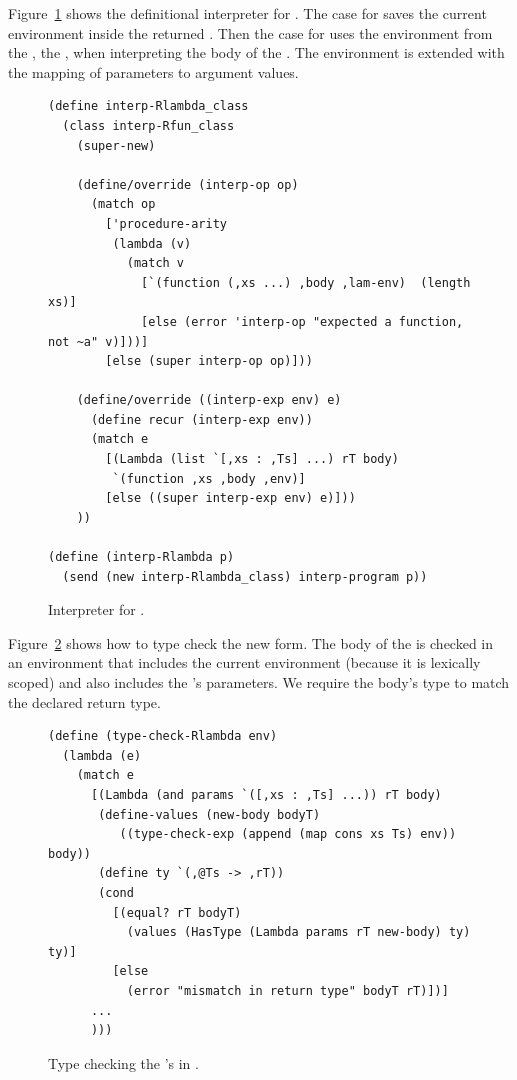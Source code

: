 \documentclass[7x10]{TimesAPriori_MIT}%
\begin{document}
\label{sec:interp-Rlambda}

Figure~\ref{fig:interp-Rlambda} shows the definitional interpreter for
\LangLam{}. The case for  saves the current environment
inside the returned . Then the case for  uses
the environment from the , the , when
interpreting the body of the .  The 
environment is extended with the mapping of parameters to argument
values.

\begin{figure}[tbp]
\begin{lstlisting}
(define interp-Rlambda_class
  (class interp-Rfun_class
    (super-new)

    (define/override (interp-op op)
      (match op
        ['procedure-arity
         (lambda (v)
           (match v
             [`(function (,xs ...) ,body ,lam-env)  (length xs)]
             [else (error 'interp-op "expected a function, not ~a" v)]))]
        [else (super interp-op op)]))

    (define/override ((interp-exp env) e)
      (define recur (interp-exp env))
      (match e
        [(Lambda (list `[,xs : ,Ts] ...) rT body)
         `(function ,xs ,body ,env)]
        [else ((super interp-exp env) e)]))
    ))

(define (interp-Rlambda p)
  (send (new interp-Rlambda_class) interp-program p))
\end{lstlisting}
\caption{Interpreter for \LangLam{}.}
\label{fig:interp-Rlambda}
\end{figure}


\label{sec:type-check-r5}

Figure~\ref{fig:type-check-Rlambda} shows how to type check the new
 form. The body of the  is checked in an
environment that includes the current environment (because it is
lexically scoped) and also includes the 's parameters.  We
require the body's type to match the declared return type.

\begin{figure}[tbp]
\begin{lstlisting}
(define (type-check-Rlambda env)
  (lambda (e)
    (match e
      [(Lambda (and params `([,xs : ,Ts] ...)) rT body)
       (define-values (new-body bodyT) 
          ((type-check-exp (append (map cons xs Ts) env)) body))
       (define ty `(,@Ts -> ,rT))
       (cond
         [(equal? rT bodyT)
           (values (HasType (Lambda params rT new-body) ty) ty)]
         [else
           (error "mismatch in return type" bodyT rT)])]
      ...
      )))
\end{lstlisting}
\caption{Type checking the 's in \LangLam{}.}
\label{fig:type-check-Rlambda}
\end{figure}
\end{document}
